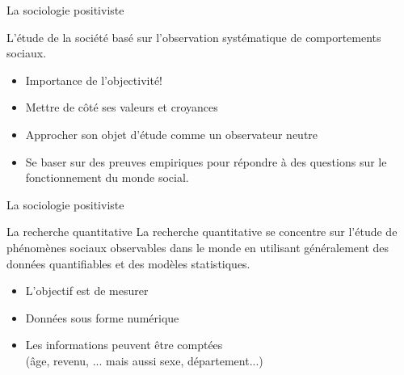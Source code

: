 \documentclass[10pt]{beamer}
\begin{document}
\begin{frame}{La sociologie positiviste}

    L'étude de la société basé sur l'observation systématique de comportements sociaux.
    \begin{itemize}
        \item Importance de l'objectivité!
        \item Mettre de côté ses valeurs et croyances
        \item Approcher son objet d'étude comme un observateur neutre
        \item Se baser sur des preuves empiriques pour répondre à des questions sur le fonctionnement du monde social.
    \end{itemize}

\end{frame}

\begin{frame}{La sociologie positiviste}
    \begin{block}{La recherche quantitative}
        La recherche quantitative se concentre sur l'étude de phénomènes sociaux observables dans le monde en utilisant généralement des données quantifiables et des modèles statistiques.
    \begin{itemize}
        \item L'objectif est de mesurer
        \item Données sous forme numérique
        \item Les informations peuvent être comptées \\(âge, revenu, ... mais aussi sexe, département...)
    \end{itemize}
    \end{block}

\end{frame}
\end{document}
